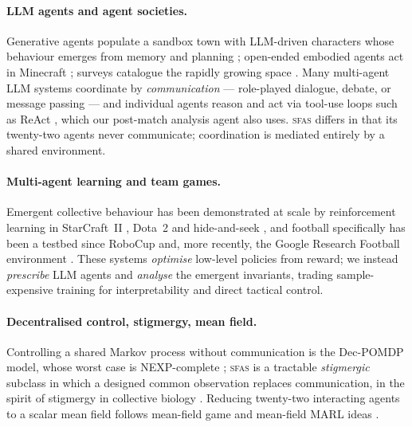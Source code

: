 \documentclass[11pt]{article}
\theoremstyle{definition}
\theoremstyle{remark}
\newcommand{\sfas}{\textsc{sfas}}
\begin{document}
\paragraph{LLM agents and agent societies.} Generative agents populate a sandbox town with LLM-driven characters whose behaviour emerges from memory and planning \citep{park2023}; open-ended embodied agents act in Minecraft \citep{wang2023voyager}; surveys catalogue the rapidly growing space \citep{wang2023survey}. Many multi-agent LLM systems coordinate by \emph{communication} --- role-played dialogue, debate, or message passing \citep{li2023camel} --- and individual agents reason and act via tool-use loops such as ReAct \citep{yao2023}, which our post-match analysis agent also uses. \sfas{} differs in that its twenty-two agents never communicate; coordination is mediated entirely by a shared environment.

\paragraph{Multi-agent learning and team games.} Emergent collective behaviour has been demonstrated at scale by reinforcement learning in StarCraft~II \citep{vinyals2019}, Dota~2 \citep{berner2019} and hide-and-seek \citep{baker2020}, and football specifically has been a testbed since RoboCup \citep{kitano1997} and, more recently, the Google Research Football environment \citep{kurach2020}. These systems \emph{optimise} low-level policies from reward; we instead \emph{prescribe} LLM agents and \emph{analyse} the emergent invariants, trading sample-expensive training for interpretability and direct tactical control.

\paragraph{Decentralised control, stigmergy, mean field.} Controlling a shared Markov process without communication is the Dec-POMDP model, whose worst case is NEXP-complete \citep{bernstein2002}; \sfas{} is a tractable \emph{stigmergic} subclass in which a designed common observation replaces communication, in the spirit of stigmergy in collective biology \citep{theraulaz1999}. Reducing twenty-two interacting agents to a scalar mean field follows mean-field game and mean-field MARL ideas \citep{lasry2007,yang2018mfmarl}.
\end{document}
